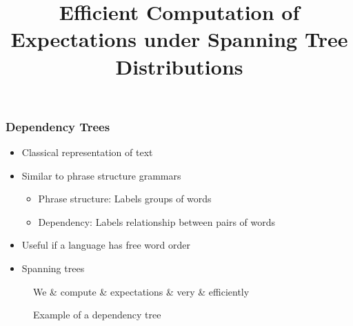 \documentclass{beamer}
\title{Efficient Computation of Expectations under Spanning Tree Distributions}
\begin{document}
 
\frame{\titlepage}

\begin{frame}
\frametitle{Dependency Trees}

\begin{itemize}
\item Classical representation of text
\item Similar to phrase structure grammars
    \begin{itemize}
    \item Phrase structure: Labels groups of words
    \item Dependency: Labels relationship between pairs of words
    \end{itemize}
\item Useful if a language has free word order
\item Spanning trees
\end{itemize}

\begin{figure}[H]
    \centering
    \begin{dependency}[theme = simple]
    \begin{deptext}[column sep=0.5em]
      We \& compute \& expectations \& very \& efficiently \\
    \end{deptext}
    \end{dependency}
    \caption{Example of a dependency tree}
    \label{fig:deptree}
\end{figure}

\end{frame}
\end{document}
